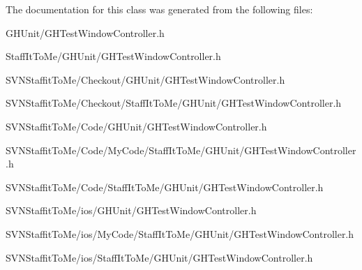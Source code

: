 \-The documentation for this class was generated from the following files\-:\begin{DoxyCompactItemize}
\item 
\-G\-H\-Unit/\-G\-H\-Test\-Window\-Controller.\-h\item 
\-Staff\-It\-To\-Me/\-G\-H\-Unit/\-G\-H\-Test\-Window\-Controller.\-h\item 
\-S\-V\-N\-Staffit\-To\-Me/\-Checkout/\-G\-H\-Unit/\-G\-H\-Test\-Window\-Controller.\-h\item 
\-S\-V\-N\-Staffit\-To\-Me/\-Checkout/\-Staff\-It\-To\-Me/\-G\-H\-Unit/\-G\-H\-Test\-Window\-Controller.\-h\item 
\-S\-V\-N\-Staffit\-To\-Me/\-Code/\-G\-H\-Unit/\-G\-H\-Test\-Window\-Controller.\-h\item 
\-S\-V\-N\-Staffit\-To\-Me/\-Code/\-My\-Code/\-Staff\-It\-To\-Me/\-G\-H\-Unit/\-G\-H\-Test\-Window\-Controller.\-h\item 
\-S\-V\-N\-Staffit\-To\-Me/\-Code/\-Staff\-It\-To\-Me/\-G\-H\-Unit/\-G\-H\-Test\-Window\-Controller.\-h\item 
\-S\-V\-N\-Staffit\-To\-Me/ios/\-G\-H\-Unit/\-G\-H\-Test\-Window\-Controller.\-h\item 
\-S\-V\-N\-Staffit\-To\-Me/ios/\-My\-Code/\-Staff\-It\-To\-Me/\-G\-H\-Unit/\-G\-H\-Test\-Window\-Controller.\-h\item 
\-S\-V\-N\-Staffit\-To\-Me/ios/\-Staff\-It\-To\-Me/\-G\-H\-Unit/\-G\-H\-Test\-Window\-Controller.\-h\end{DoxyCompactItemize}
